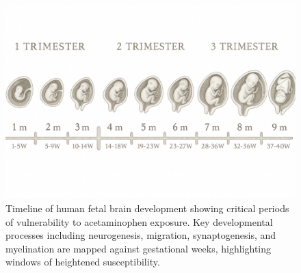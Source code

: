 \documentclass[12pt]{article}
\begin{document}

\begin{figure}[h]
\centering
\includegraphics[width=\textwidth]{../assets/fetal-development.png}
\caption{Timeline of human fetal brain development showing critical periods of vulnerability to acetaminophen exposure. Key developmental processes including neurogenesis, migration, synaptogenesis, and myelination are mapped against gestational weeks, highlighting windows of heightened susceptibility.}
\label{fig:fetal-development}
\end{figure}

\end{document}
